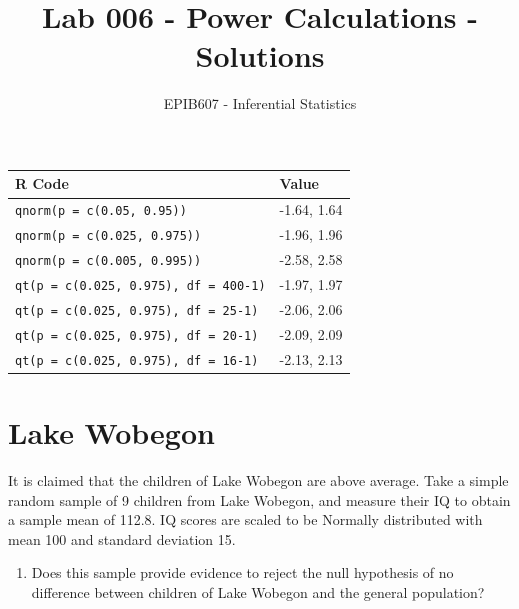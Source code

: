 \documentclass[letterpaper,11pt,twoside,]{pinp}
\title{Lab 006 - Power Calculations - Solutions}
\author[a]{EPIB607 - Inferential Statistics}
\affil[a]{McGill University}
\providecommand{\tightlist}{%
  \setlength{\itemsep}{0pt}\setlength{\parskip}{0pt}}
\begin{document}
\verticaladjustment{-2pt}

\maketitle
\thispagestyle{firststyle}



\begin{longtable}[]{@{}ll@{}}
\toprule
R Code & Value \\
\midrule
\endhead
\texttt{qnorm(p\ =\ c(0.05,\ 0.95))} & -1.64, 1.64 \\
\texttt{qnorm(p\ =\ c(0.025,\ 0.975))} & -1.96, 1.96 \\
\texttt{qnorm(p\ =\ c(0.005,\ 0.995))} & -2.58, 2.58 \\
\texttt{qt(p\ =\ c(0.025,\ 0.975),\ df\ =\ 400-1)} & -1.97, 1.97 \\
\texttt{qt(p\ =\ c(0.025,\ 0.975),\ df\ =\ 25-1)} & -2.06, 2.06 \\
\texttt{qt(p\ =\ c(0.025,\ 0.975),\ df\ =\ 20-1)} & -2.09, 2.09 \\
\texttt{qt(p\ =\ c(0.025,\ 0.975),\ df\ =\ 16-1)} & -2.13, 2.13 \\
\bottomrule
\end{longtable}

\hypertarget{lake-wobegon}{%
\section{Lake Wobegon}\label{lake-wobegon}}

It is claimed that the children of Lake Wobegon are above average. Take
a simple random sample of 9 children from Lake Wobegon, and measure
their IQ to obtain a sample mean of 112.8. IQ scores are scaled to be
Normally distributed with mean 100 and standard deviation 15.

\begin{enumerate}
\def\labelenumi{\alph{enumi})}
\tightlist
\item
  Does this sample provide evidence to reject the null hypothesis of no
  difference between children of Lake Wobegon and the general
  population?
\end{enumerate}
\end{document}
